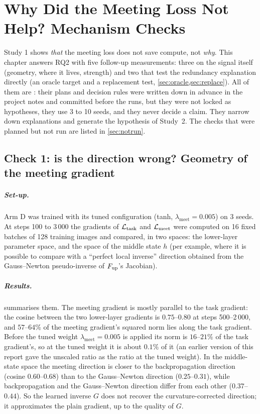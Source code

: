 \chapter{Why Did the Meeting Loss Not Help? Mechanism Checks}\label{ch:mechanism}

Study 1 shows \emph{that} the meeting loss does not save compute, not \emph{why}. This chapter answers RQ2 with five follow-up measurements: three on the signal itself (geometry, where it lives, strength) and two that test the redundancy explanation directly (an oracle target and a replacement test, \cref{sec:oracle,sec:replace}). All of them are \tierE{}: their plans and decision rules were written down in advance in the project notes and committed before the runs, but they were not locked as hypotheses, they use 3 to 10 seeds, and they never decide a claim. They narrow down explanations and generate the hypothesis of Study~2. The checks that were planned but not run are listed in \cref{sec:notrun}.

\section{Check 1: is the direction wrong? Geometry of the meeting gradient}\label{sec:geometry}
\paragraph{Set-up.} Arm D was trained with its tuned configuration (tanh, $\lambda_{\mathrm{meet}}=0.005$) on 3 seeds. At steps 100 to 3\,000 the gradients of $\mathcal{L}_{\mathrm{task}}$ and $\mathcal{L}_{\mathrm{meet}}$ were computed on 16 fixed batches of 128 training images and compared, in two spaces: the lower-layer parameter space, and the space of the middle state $h$ (per example, where it is possible to compare with a ``perfect local inverse'' direction obtained from the Gauss--Newton pseudo-inverse of $F_{\mathrm{up}}$'s Jacobian).

\paragraph{Results.}  summarises them. The meeting gradient is mostly parallel to the task gradient: the cosine between the two lower-layer gradients is $0.75$--$0.80$ at steps 500--2\,000, and $57$--$64\%$ of the meeting gradient's squared norm lies along the task gradient. Before the tuned weight $\lambda_{\mathrm{meet}}=0.005$ is applied its norm is $16$--$21\%$ of the task gradient's, so at the tuned weight it is about $0.1\%$ of it (an earlier version of this report gave the unscaled ratio as the ratio at the tuned weight). In the middle-state space the meeting direction is closer to the backpropagation direction (cosine $0.60$--$0.68$) than to the Gauss--Newton direction ($0.25$--$0.31$), while backpropagation and the Gauss--Newton direction differ from each other ($0.37$--$0.44$). So the learned inverse $G$ does not recover the curvature-corrected direction; it approximates the plain gradient, up to the quality of $G$.

